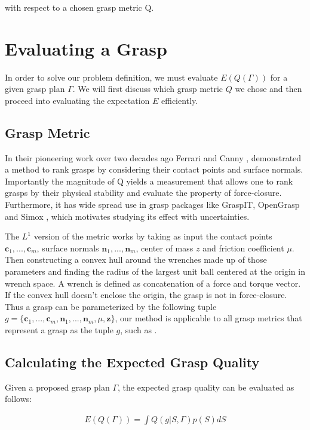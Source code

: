 \documentclass[letterpaper, 10 pt, conference]{ieeeconf}  %
\begin{document}
with respect to a chosen grasp metric Q. 

\section{Evaluating a Grasp}
In order to solve our problem definition, we must evaluate $E(Q(\Gamma))$ for a given grasp plan $\Gamma$. We will first discuss which grasp metric $Q$ we chose and then proceed into evaluating the expectation $E$ efficiently. 

\subsection{Grasp Metric}
In their pioneering work over two decades ago Ferrari and Canny \cite{ferrari1992}, demonstrated a method to rank grasps by considering their contact points and surface normals. Importantly the magnitude of Q yields a measurement that allows one to rank grasps by their physical stability and evaluate the property of force-closure. Furthermore, it has wide spread use in grasp packages like GraspIT\cite{miller2004graspit}, OpenGrasp\cite{73} and Simox \cite{vahrenkamp2010simo}, which motivates studying its effect with uncertainties. 

The $L^1$ version of the metric works by taking as input the contact points $\textbf{c}_1,...,\textbf{c}_m$, surface normals $\textbf{n}_1,...,\textbf{n}_m$, center of mass $z$ and friction coefficient $\mu$. Then constructing a convex hull around the wrenches made up of those parameters and finding the radius of the largest unit ball centered at the origin in wrench space. A wrench is defined as concatenation of a force and torque vector.  If the convex hull doesn't enclose the origin, the grasp is not in force-closure. Thus a grasp can be parameterized by the following tuple $g = \lbrace \textbf{c}_1,...,\textbf{c}_m,\textbf{n}_1,...,\textbf{n}_m,\mu, \textbf{z} \rbrace$, our method is applicable to all grasp metrics that represent a grasp as the tuple $g$, such as \cite{christopoulos2007handling}\cite{li1988task}. 

\subsection{Calculating the Expected Grasp Quality}
Given a proposed grasp plan $\Gamma$, the expected grasp quality can be evaluated as follows:

\vspace{-2ex}
\begin{align}\label{eq:shape_sampling}
E(Q(\Gamma)) = \int Q(g|S,\Gamma) p(S) dS
\end{align}
\end{document}
